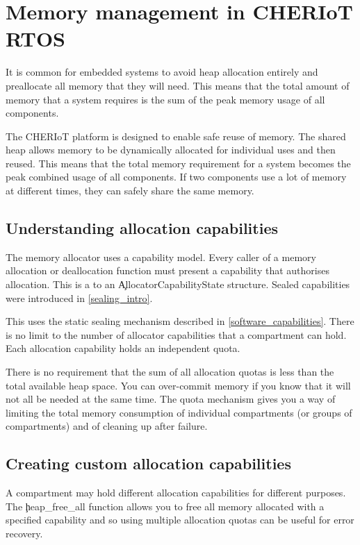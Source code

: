 \chapter[label=shared_heap]{Memory management in CHERIoT RTOS}

It is common for embedded systems to avoid heap allocation entirely and preallocate all memory that they will need.
This means that the total amount of memory that a system requires is the sum of the peak memory usage of all components.

The CHERIoT platform is designed to enable safe reuse of memory.
The shared heap allows memory to be dynamically allocated for individual uses and then reused.
This means that the total memory requirement for a system becomes the peak combined usage of all components.
If two components use a lot of memory at different times, they can safely share the same memory.

\section{Understanding allocation capabilities}

The memory allocator uses a capability model.
Every caller of a memory allocation or deallocation function must present a capability that authorises allocation.
This is a  to an \c{AllocatorCapabilityState} structure.
Sealed capabilities were introduced in \ref{sealing_intro}.

This uses the static sealing mechanism described in \ref{software_capabilities}.
There is no limit to the number of allocator capabilities that a compartment can hold.
Each allocation capability holds an independent quota.

There is no requirement that the sum of all allocation quotas is less than the total available heap space.
You can over-commit memory if you know that it will not all be needed at the same time.
The quota mechanism gives you a way of limiting the total memory consumption of individual compartments (or groups of compartments) and of cleaning up after failure.

\section[label=custom_alloc_capabilities]{Creating custom allocation capabilities}

A compartment may hold different allocation capabilities for different purposes.
The \c{heap_free_all} function allows you to free all memory allocated with a specified capability and so using multiple allocation quotas can be useful for error recovery.

